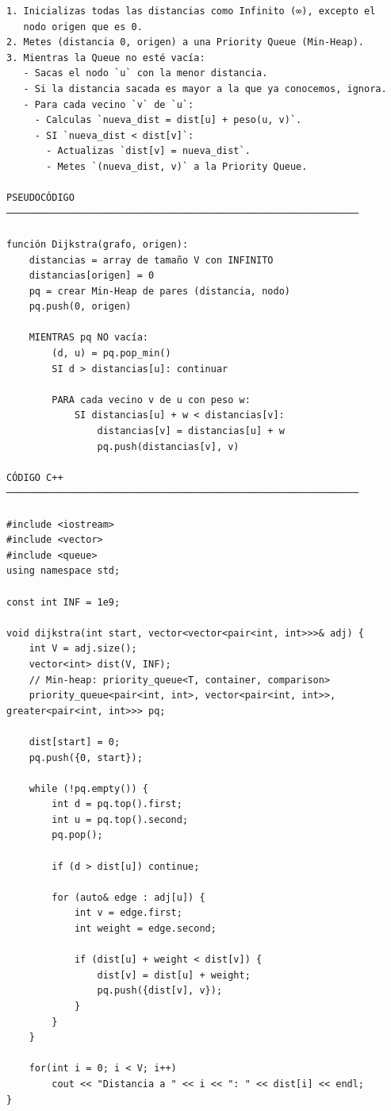 \begin{lstlisting}
1. Inicializas todas las distancias como Infinito (∞), excepto el
   nodo origen que es 0.
2. Metes (distancia 0, origen) a una Priority Queue (Min-Heap).
3. Mientras la Queue no esté vacía:
   - Sacas el nodo `u` con la menor distancia.
   - Si la distancia sacada es mayor a la que ya conocemos, ignora.
   - Para cada vecino `v` de `u`:
     - Calculas `nueva_dist = dist[u] + peso(u, v)`.
     - SI `nueva_dist < dist[v]`:
       - Actualizas `dist[v] = nueva_dist`.
       - Metes `(nueva_dist, v)` a la Priority Queue.

PSEUDOCÓDIGO
──────────────────────────────────────────────────────────────

función Dijkstra(grafo, origen):
    distancias = array de tamaño V con INFINITO
    distancias[origen] = 0
    pq = crear Min-Heap de pares (distancia, nodo)
    pq.push(0, origen)

    MIENTRAS pq NO vacía:
        (d, u) = pq.pop_min()
        SI d > distancias[u]: continuar
        
        PARA cada vecino v de u con peso w:
            SI distancias[u] + w < distancias[v]:
                distancias[v] = distancias[u] + w
                pq.push(distancias[v], v)

CÓDIGO C++
──────────────────────────────────────────────────────────────

#include <iostream>
#include <vector>
#include <queue>
using namespace std;

const int INF = 1e9;

void dijkstra(int start, vector<vector<pair<int, int>>>& adj) {
    int V = adj.size();
    vector<int> dist(V, INF);
    // Min-heap: priority_queue<T, container, comparison>
    priority_queue<pair<int, int>, vector<pair<int, int>>, greater<pair<int, int>>> pq;

    dist[start] = 0;
    pq.push({0, start});

    while (!pq.empty()) {
        int d = pq.top().first;
        int u = pq.top().second;
        pq.pop();

        if (d > dist[u]) continue;

        for (auto& edge : adj[u]) {
            int v = edge.first;
            int weight = edge.second;

            if (dist[u] + weight < dist[v]) {
                dist[v] = dist[u] + weight;
                pq.push({dist[v], v});
            }
        }
    }

    for(int i = 0; i < V; i++) 
        cout << "Distancia a " << i << ": " << dist[i] << endl;
}


\end{lstlisting}

